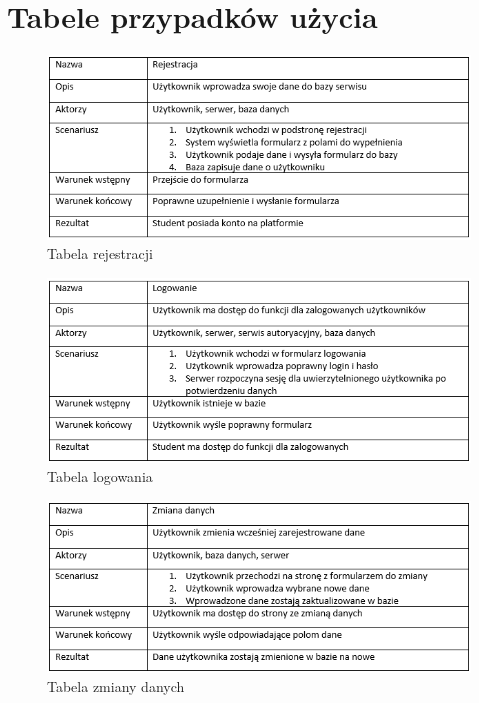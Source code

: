 \documentclass[a4paper,11pt]{uzreport}
\begin{document}
\section{Tabele przypadków użycia}
    \begin{figure}[ht!]
        \centering
        \includegraphics[width=6in]{pictures/rejestracja.PNG}
        \caption{Tabela rejestracji}
        \label{fig4}
     \end{figure}
     \begin{figure}[ht!]
        \centering
        \includegraphics[width=6in]{pictures/logowanie.PNG}
        \caption{Tabela logowania}
        \label{fig5}
     \end{figure}
     \begin{figure}[ht!]
        \centering
        \includegraphics[width=6in]{pictures/zmiana danych.PNG}
        \caption{Tabela zmiany danych}
        \label{fig6}
     \end{figure}
\end{document}
